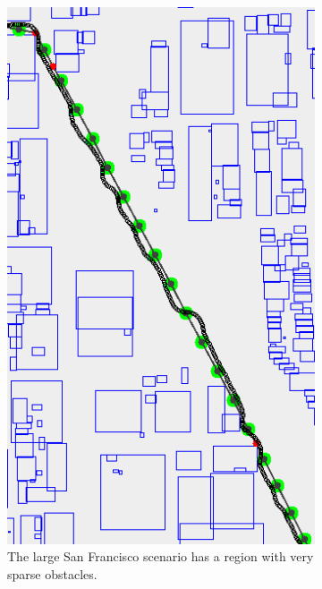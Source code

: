 \begin{figure}[h]
	\centering
	
	\begin{subfigure}[t]{.40\textwidth}
        		\includegraphics[width=\textwidth]{img/sf-sparse}
        		\caption{The large San Francisco scenario has a region with very sparse obstacles.}
        		\label{fig:sf-sparse}
	\end{subfigure}
	\hfil
	\begin{subfigure}[t]{.45\textwidth}

\end{subfigure}
\end{figure}
